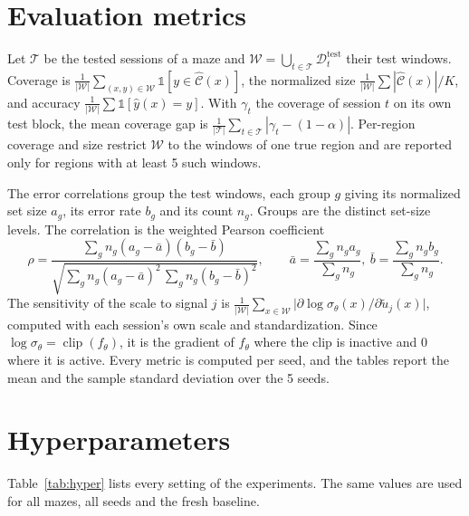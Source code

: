 \documentclass{article}
\begin{document}
\section{Evaluation metrics}
\label{app:metrics}
Let $\mathcal{T}$ be the tested sessions of a maze and $\mathcal{W}=\bigcup_{t\in\mathcal{T}}\mathcal{D}^{\mathrm{test}}_t$ their test windows. Coverage is $\frac{1}{|\mathcal{W}|}\sum_{(x,y)\in\mathcal{W}}\mathbb{1}[y\in\widehat{\mathcal{C}}(x)]$, the normalized size $\frac{1}{|\mathcal{W}|}\sum|\widehat{\mathcal{C}}(x)|/K$, and accuracy $\frac{1}{|\mathcal{W}|}\sum\mathbb{1}[\hat y(x)=y]$. With $\gamma_t$ the coverage of session $t$ on its own test block, the mean coverage gap is $\frac{1}{|\mathcal{T}|}\sum_{t\in\mathcal{T}}|\gamma_t-(1-\alpha)|$. Per-region coverage and size restrict $\mathcal{W}$ to the windows of one true region and are reported only for regions with at least 5 such windows.

The error correlations group the test windows, each group $g$ giving its normalized set size $a_g$, its error rate $b_g$ and its count $n_g$. Groups are the distinct set-size levels. The correlation is the weighted Pearson coefficient
\begin{equation}
  \rho=\frac{\sum_g n_g(a_g-\bar a)(b_g-\bar b)}{\sqrt{\sum_g n_g(a_g-\bar a)^2\,\sum_g n_g(b_g-\bar b)^2}},\qquad \bar a=\frac{\sum_g n_g a_g}{\sum_g n_g},\ \bar b=\frac{\sum_g n_g b_g}{\sum_g n_g}.
\end{equation}
The sensitivity of the scale to signal $j$ is $\frac{1}{|\mathcal{W}|}\sum_{x\in\mathcal{W}}\big|\partial\log\sigma_\theta(x)/\partial\tilde u_j(x)\big|$, computed with each session's own scale and standardization. Since $\log\sigma_\theta=\operatorname{clip}(f_\theta)$, it is the gradient of $f_\theta$ where the clip is inactive and 0 where it is active. Every metric is computed per seed, and the tables report the mean and the sample standard deviation over the 5 seeds.

\section{Hyperparameters}
\label{app:hyper}
Table~\ref{tab:hyper} lists every setting of the experiments. The same values are used for all mazes, all seeds and the fresh baseline.
\end{document}
